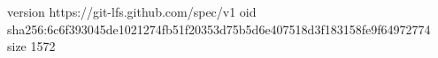 version https://git-lfs.github.com/spec/v1
oid sha256:6c6f393045de1021274fb51f20353d75b5d6e407518d3f183158fe9f64972774
size 1572
